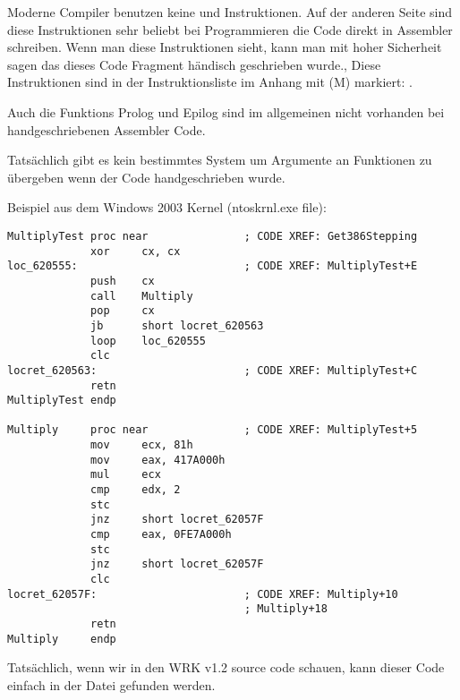 
Moderne Compiler benutzen keine  und  Instruktionen.
Auf der anderen Seite sind diese Instruktionen sehr beliebt bei Programmieren die Code direkt in Assembler schreiben.
Wenn man diese Instruktionen sieht, kann man mit hoher Sicherheit sagen das dieses Code Fragment händisch geschrieben wurde.,
Diese Instruktionen sind in der Instruktionsliste im Anhang mit (M) markiert: .

\par

Auch die Funktions Prolog und Epilog sind im allgemeinen nicht vorhanden bei handgeschriebenen Assembler Code. %
\par

Tatsächlich gibt es kein bestimmtes System um Argumente an Funktionen zu übergeben wenn der Code handgeschrieben wurde. 

\par
Beispiel aus dem Windows 2003 Kernel
(ntoskrnl.exe file):

\begin{lstlisting}[style=customasmx86]
MultiplyTest proc near               ; CODE XREF: Get386Stepping
             xor     cx, cx
loc_620555:                          ; CODE XREF: MultiplyTest+E
             push    cx
             call    Multiply
             pop     cx
             jb      short locret_620563
             loop    loc_620555
             clc
locret_620563:                       ; CODE XREF: MultiplyTest+C
             retn
MultiplyTest endp

Multiply     proc near               ; CODE XREF: MultiplyTest+5
             mov     ecx, 81h
             mov     eax, 417A000h
             mul     ecx
             cmp     edx, 2
             stc
             jnz     short locret_62057F
             cmp     eax, 0FE7A000h
             stc
             jnz     short locret_62057F
             clc
locret_62057F:                       ; CODE XREF: Multiply+10
                                     ; Multiply+18
             retn
Multiply     endp
\end{lstlisting}

Tatsächlich, wenn wir in den 
\ac{WRK} v1.2 source code schauen,
kann dieser Code einfach in der Datei
 gefunden werden.
